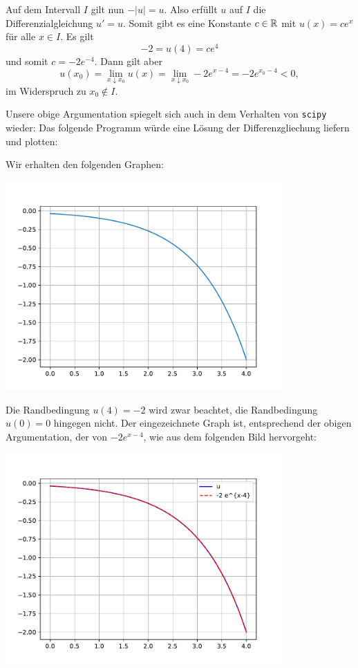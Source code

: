 Auf dem Intervall $I$ gilt nun $-|u| = u$.
Also erfüllt $u$ auf $I$ die Differenzialgleichung $u' = u$.
Somit gibt es eine Konstante $c \in \mathbb{R}$ mit $u(x) = c e^x$ für alle $x \in I$.
Es gilt
\[
    -2
  = u(4)
  = c e^4
\]
und somit $c = -2 e^{-4}$.
Dann gilt aber
\[
    u(x_0)
  = \lim_{x \downarrow x_0} u(x)
  = \lim_{x \downarrow x_0} -2 e^{x-4}
  = -2 e^{x_0-4}
  < 0,
\]
im Widerspruch zu $x_0 \notin I$.

Unsere obige Argumentation spiegelt sich auch in dem Verhalten von \texttt{scipy} wieder:
Das folgende Programm würde eine Lösung der Differenzgliechung liefern und plotten:



Wir erhalten den folgenden Graphen:

\begin{center}
  \includegraphics[width = 0.8\textwidth]{chapter_04/exercise_04_22_figure_1.pdf}
\end{center}

Die Randbedingung $u(4) = -2$ wird zwar beachtet, die Randbedingung $u(0) = 0$ hingegen nicht.
Der eingezeichnete Graph ist, entsprechend der obigen Argumentation, der von $-2 e^{x-4}$, wie aus dem folgenden Bild hervorgeht:

\begin{center}
  \includegraphics[width = 0.8\textwidth]{chapter_04/exercise_04_22_figure_2.pdf}
\end{center}














